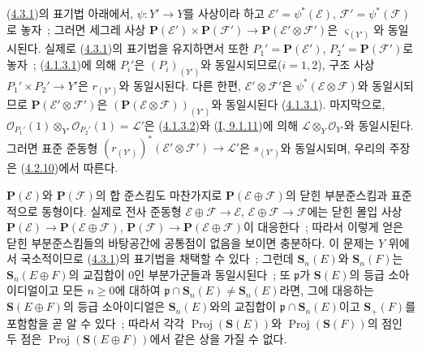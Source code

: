 \begin{env}[4.3.5]
\label{II.4.3.5-ko}
(\hyperref[II.4.3.1-ko]{4.3.1})의 표기법 아래에서,
$\psi:Y'\to Y$를 사상이라 하고
$\mathcal{E}'=\psi^*(\mathcal{E})$, $\mathcal{F}'=\psi^*(\mathcal{F})$로 놓자~;
그러면 세그레 사상
$\mathbf{P}(\mathcal{E}')\times\mathbf{P}(\mathcal{F}')
\to\mathbf{P}(\mathcal{E}'\otimes\mathcal{F}')$은
$\varsigma_{(Y')}$와 동일시된다. 실제로
(\hyperref[II.4.3.1-ko]{4.3.1})의 표기법을 유지하면서 또한
$P_1'=\mathbf{P}(\mathcal{E}')$, $P_2'=\mathbf{P}(\mathcal{F}')$로
놓자~; (\hyperref[II.4.1.3.1-ko]{4.1.3.1})에 의해 $P_i'$은
$(P_i)_{(Y')}$와 동일시되므로($i=1,2$), 구조 사상
$P_1'\times P_2'\to Y'$은 $r_{(Y')}$와 동일시된다. 다른 한편,
$\mathcal{E}'\otimes\mathcal{F}'$은
$\psi^*(\mathcal{E}\otimes\mathcal{F})$와 동일시되므로
$\mathbf{P}(\mathcal{E}'\otimes\mathcal{F}')$은
$(\mathbf{P}(\mathcal{E}\otimes\mathcal{F}))_{(Y')}$와 동일시된다
(\hyperref[II.4.1.3.1-ko]{4.1.3.1}). 마지막으로,
$\mathcal{O}_{P_1'}(1)\otimes_{Y'}\mathcal{O}_{P_2'}(1)=\mathcal{L}'$은
(\hyperref[II.4.1.3.2-ko]{4.1.3.2})와
(\hyperref[I.9.1.11-ko]{I, 9.1.11})에 의해
$\mathcal{L}\otimes_Y\mathcal{O}_{Y'}$와 동일시된다. 그러면 표준 준동형
$(r_{(Y')})^*(\mathcal{E}'\otimes\mathcal{F}')\to\mathcal{L}'$은
$s_{(Y')}$와 동일시되며, 우리의 주장은
(\hyperref[II.4.2.10-ko]{4.2.10})에서 따른다.
\end{env}

\begin{remark}[4.3.6]
\label{II.4.3.6-ko}
$\mathbf{P}(\mathcal{E})$와 $\mathbf{P}(\mathcal{F})$의 합 준스킴도
마찬가지로 $\mathbf{P}(\mathcal{E}\oplus\mathcal{F})$의 닫힌
부분준스킴과 표준적으로 동형이다. 실제로 전사 준동형
$\mathcal{E}\oplus\mathcal{F}\to\mathcal{E}$,
$\mathcal{E}\oplus\mathcal{F}\to\mathcal{F}$에는 닫힌 몰입 사상
$\mathbf{P}(\mathcal{E})\to\mathbf{P}(\mathcal{E}\oplus\mathcal{F})$,
$\mathbf{P}(\mathcal{F})\to\mathbf{P}(\mathcal{E}\oplus\mathcal{F})$이
대응한다~; 따라서 이렇게 얻은 닫힌 부분준스킴들의 바탕공간에 공통점이
없음을 보이면 충분하다. 이 문제는 $Y$ 위에서 국소적이므로
(\hyperref[II.4.3.1-ko]{4.3.1})의 표기법을 채택할 수 있다~; 그런데
$\mathbf{S}_n(E)$와 $\mathbf{S}_n(F)$는
$\mathbf{S}_n(E\oplus F)$의 교집합이 $0$인 부분가군들과 동일시된다~;
또 $\mathfrak{p}$가 $\mathbf{S}(E)$의 등급 소아이디얼이고 모든
$n\geq0$에 대하여
$\mathfrak{p}\cap\mathbf{S}_n(E)\neq\mathbf{S}_n(E)$라면, 그에
대응하는 $\mathbf{S}(E\oplus F)$의 등급 소아이디얼은
$\mathbf{S}_n(E)$와의 교집합이
$\mathfrak{p}\cap\mathbf{S}_n(E)$이고 $\mathbf{S}_+(F)$를 포함함을
곧 알 수 있다~; 따라서 각각
$\operatorname{Proj}(\mathbf{S}(E))$와
$\operatorname{Proj}(\mathbf{S}(F))$의 점인 두 점은
$\operatorname{Proj}(\mathbf{S}(E\oplus F))$에서 같은 상을 가질 수 없다.
\end{remark}

